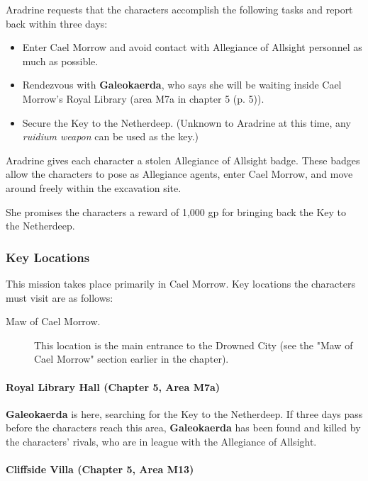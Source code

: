 \documentclass[a4paper, 11pt, bg=full, twocolumn, nooutline]{dndbook}
\begin{document}
Aradrine requests that the characters accomplish the following tasks and report back within three days:

\begin{itemize}
\item Enter Cael Morrow and avoid contact with Allegiance of Allsight personnel as much as possible.
\item Rendezvous with \textbf{Galeokaerda}, who says she will be waiting inside Cael Morrow's Royal Library (area M7a in chapter 5 (p. 5)).
\item Secure the Key to the Netherdeep. (Unknown to Aradrine at this time, any \textit{ruidium weapon} can be used as the key.)
\end{itemize}

Aradrine gives each character a stolen Allegiance of Allsight badge. These badges allow the characters to pose as Allegiance agents, enter Cael Morrow, and move around freely within the excavation site.

She promises the characters a reward of 1,000 gp for bringing back the Key to the Netherdeep.

\subsubsection{Key Locations}

This mission takes place primarily in Cael Morrow. Key locations the characters must visit are as follows:

\begin{description}
\item[Maw of Cael Morrow.] This location is the main entrance to the Drowned City (see the "Maw of Cael Morrow" section earlier in the chapter).
\end{description}

\paragraph{Royal Library Hall (Chapter 5, Area M7a)}

\textbf{Galeokaerda} is here, searching for the Key to the Netherdeep. If three days pass before the characters reach this area, \textbf{Galeokaerda} has been found and killed by the characters' rivals, who are in league with the Allegiance of Allsight.

\paragraph{Cliffside Villa (Chapter 5, Area M13)}
\end{document}
